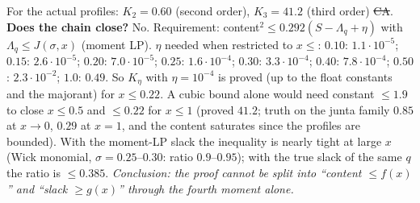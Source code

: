 For the actual profiles: $K_2=0.60$ (second order), $K_3=41.2$ (third order) \st{CA}. \textbf{Does the chain close?} No. Requirement: content$^2\le0.292(S-\Lambda_q+\eta)$
with $\Lambda_q\le J(\sigma,x)$ (moment LP). $\eta$ needed when restricted to $x\le$: $0.10$: $1.1\cdot10^{-5}$; $0.15$: $2.6\cdot10^{-5}$; $0.20$: $7.0\cdot10^{-5}$; $0.25$:
$1.6\cdot10^{-4}$; $0.30$: $3.3\cdot10^{-4}$; $0.40$: $7.8\cdot10^{-4}$; $0.50$: $2.3\cdot10^{-2}$; $1.0$: $0.49$. So $K_\eta$ with $\eta=10^{-4}$ is proved (up to the float constants and
the majorant) for $x\le0.22$. A cubic bound alone would need constant $\le1.9$ to close $x\le0.5$ and $\le0.22$ for $x\le1$ (proved $41.2$; truth on the junta family
$0.85$ at $x\to0$, $0.29$ at $x=1$, and the content saturates since the profiles are bounded). With the moment-LP slack the inequality is nearly tight at large
$x$ (Wick monomial, $\sigma=0.25$--$0.30$: ratio $0.9$--$0.95$); with the true slack of the same $q$ the ratio is $\le0.385$. \emph{Conclusion: the proof cannot be
split into ``content $\le f(x)$'' and ``slack $\ge g(x)$'' through the fourth moment alone.}

